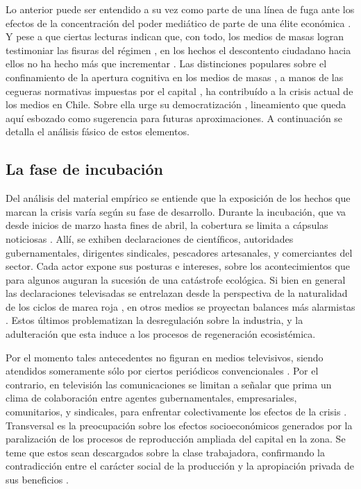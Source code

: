\documentclass{textolivre}
\begin{document}
Lo anterior puede ser entendido a su vez como parte de una línea de fuga ante los
efectos de la concentración del poder mediático de parte de una élite económica
\cite{sapiezynska2013}. Y pese a que ciertas lecturas indican que,
con todo, los medios de masas logran testimoniar las fisuras del régimen \cite{billi2017},
en los hechos el descontento ciudadano hacia ellos no ha
hecho más que incrementar \cite{almeida}. Las distinciones populares sobre
el confinamiento de la apertura cognitiva en los medios de masas \cite{Tkke2010}, 
a manos de las cegueras normativas impuestas por el capital \cite{mosco2016}, 
ha contribuído a la crisis actual de los medios en Chile. Sobre ella urge su
democratización \cite{cardenas2019}, lineamiento que queda aquí esbozado como
sugerencia para futuras aproximaciones. A continuación se detalla el análisis fásico de
estos elementos.



\subsection{La fase de incubación}\label{sec-fase-incu}

Del análisis del material empírico se entiende que la exposición de los hechos que
marcan la crisis varía según su fase de desarrollo. Durante la incubación, que va desde
inicios de marzo hasta fines de abril, la cobertura se limita a cápsulas noticiosas
\cite{burrows2016}. Allí, se exhiben declaraciones de científicos, autoridades
gubernamentales, dirigentes sindicales, pescadores artesanales, y comerciantes del
sector. Cada actor expone sus posturas e intereses, sobre los acontecimientos que para
algunos auguran la sucesión de una catástrofe ecológica. Si bien en general las
declaraciones televisadas se entrelazan desde la perspectiva de la naturalidad de los
ciclos de marea roja \cite{cabello2018}, en otros medios se
proyectan balances más alarmistas \cite{desconcierto}. Estos últimos
problematizan la desregulación sobre la industria, y la adulteración que esta induce a los
procesos de regeneración ecosistémica.

Por el momento tales antecedentes no figuran en medios televisivos, siendo
atendidos someramente sólo por ciertos periódicos convencionales \cite{tercera}.
Por el contrario, en televisión las comunicaciones se limitan a señalar que prima un clima
de colaboración entre agentes gubernamentales, empresariales, comunitarios, y
sindicales, para enfrentar colectivamente los efectos de la crisis \cite{burrows2016}.
Transversal es la preocupación sobre los efectos socioeconómicos generados por la
paralización de los procesos de reproducción ampliada del capital en la zona. Se teme
que estos sean descargados sobre la clase trabajadora, confirmando la contradicción
entre el carácter social de la producción y la apropiación privada de sus beneficios
\cite{wallerstein}.
\end{document}
